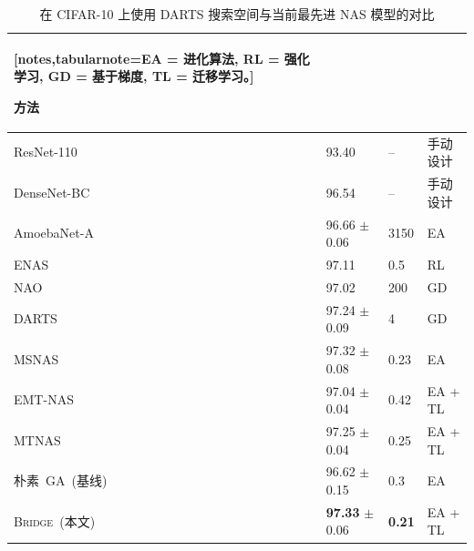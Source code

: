 \documentclass[../main.tex]{subfiles}
\begin{document}
\begin{table}
	\centering
	\caption{在 CIFAR-10 上使用 DARTS 搜索空间与当前最先进 NAS 模型的对比}\label{tab:transfer-result-301}

	\small\begin{NiceTabularX}{\textwidth}{p{9em}X[c]X[c]l}[notes,tabularnote={EA = 进化算法, RL = 强化学习, GD = 基于梯度, TL = 迁移学习。}]

		\toprule
		方法                                             &  &  &  \\
		\midrule\midrule
		ResNet-110~\cite{DBLP:conf/cvpr/HeZRS16}         & 93.40                        & --                             & 手动设计              \\
		DenseNet-BC~\cite{DBLP:conf/cvpr/HuangLMW17}     & 96.54                        & --                             & 手动设计              \\
		\midrule
		AmoebaNet-A~\cite{DBLP:conf/aaai/RealAHL19}      & 96.66 \(\pm\) 0.06           & 3150                           & EA                    \\
		ENAS~\cite{pham_efficient_2018}                  & 97.11                        & 0.5                            & RL                    \\
		NAO~\cite{DBLP:conf/nips/LuoTQCL18}              & 97.02                        & 200                            & GD                    \\
		DARTS~\cite{DBLP:conf/iclr/LiuSY19}              & 97.24 \(\pm\) 0.09           & 4                              & GD                    \\
		MSNAS~\cite{DBLP:journals/tnn/DongHFTTO23}       & 97.32 \(\pm\) 0.08           & 0.23                           & EA                    \\
		\midrule
		EMT-NAS~\cite{DBLP:conf/cvpr/LiaoJD23}           & 97.04 \(\pm\) 0.04           & 0.42                           & EA + TL               \\
		MTNAS~\cite{DBLP:journals/tec/ZhouWFLWT24}       & 97.25 \(\pm\) 0.04           & 0.25                           & EA + TL               \\
		\midrule
		朴素~GA~(基线)                                   & 96.62 \(\pm\) 0.15           & 0.3                            & EA                    \\
		\textsc{Bridge}~(本文)                           & \textbf{97.33} \(\pm\) 0.06  & \bfseries 0.21                 & EA + TL               \\
		\bottomrule
	\end{NiceTabularX}
\end{table}
\end{document}
